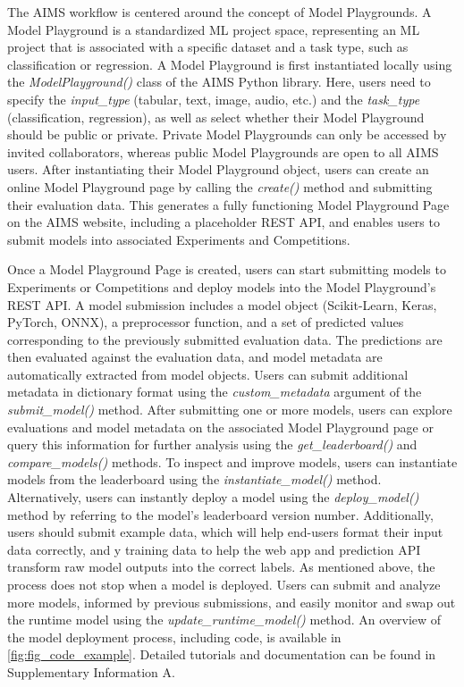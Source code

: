 The AIMS workflow is centered around the concept of Model Playgrounds. A Model Playground is a standardized ML project space, representing an ML project that is associated with a specific dataset and a task type, such as classification or regression. A Model Playground is first instantiated locally using the \textit{ModelPlayground()} class of the AIMS Python library. Here, users need to specify the \textit{input\_type} (tabular, text, image, audio, etc.) and the \textit{task\_type} (classification, regression), as well as select whether their Model Playground should be public or private. Private Model Playgrounds can only be accessed by invited collaborators, whereas public Model Playgrounds are open to all AIMS users. After instantiating their Model Playground object, users can create an online Model Playground page by calling the \textit{create()} method and submitting their evaluation data. This generates a fully functioning Model Playground Page on the AIMS website, including a placeholder REST API, and enables users to submit models into associated Experiments and Competitions.

Once a Model Playground Page is created, users can start submitting models to Experiments or Competitions and deploy models into the Model Playground’s REST API. A model submission includes a model object (Scikit-Learn, Keras, PyTorch, ONNX), a preprocessor function, and a set of predicted values corresponding to the previously submitted evaluation data. The predictions are then evaluated against the evaluation data, and model metadata are automatically extracted from model objects. Users can submit additional metadata in dictionary format using the \textit{custom\_metadata} argument of the \textit{submit\_model()} method. After submitting one or more models, users can explore evaluations and model metadata on the associated Model Playground page or query this information for further analysis using the \textit{get\_leaderboard()} and \textit{compare\_models()} methods. To inspect and improve models, users can instantiate models from the leaderboard using the \textit{instantiate\_model()} method. Alternatively, users can instantly deploy a model using the \textit{deploy\_model()} method by referring to the model’s leaderboard version number. Additionally, users should submit example data, which will help end-users format their input data correctly, and y training data to help the web app and prediction API transform raw model outputs into the correct labels. As mentioned above, the process does not stop when a model is deployed. Users can submit and analyze more models, informed by previous submissions, and easily monitor and swap out the runtime model using the \textit{update\_runtime\_model()} method. An overview of the model deployment process, including code, is available in \autoref{fig:fig_code_example}. Detailed tutorials and documentation can be found in Supplementary Information A.


